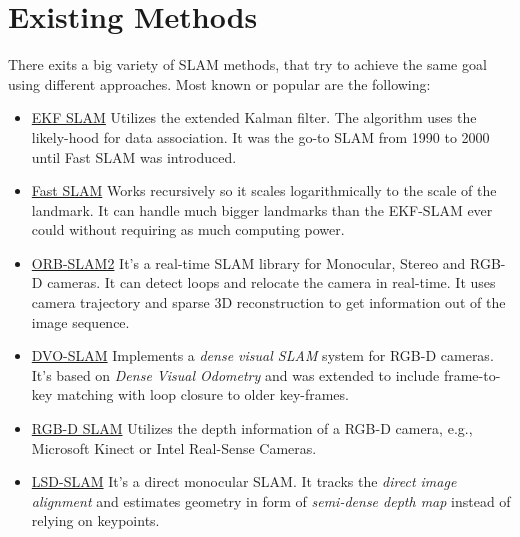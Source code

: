 \section{Existing Methods}
There exits a big variety of SLAM methods, that try to achieve the same goal using different approaches\cite{openslam}.
Most known or popular are the following:
\begin{itemize}
    \item \underline{EKF SLAM} \newline
    Utilizes the extended Kalman filter. The algorithm  uses the likely-hood for data association.
    It was the go-to SLAM from 1990 to 2000 until Fast SLAM was introduced. \cite{Fastslam}
    
    \item \underline{Fast SLAM} \newline
    Works recursively  so it scales logarithmically to the scale of the landmark. It can handle much bigger landmarks than the EKF-SLAM ever could without requiring as much computing power. \cite{Fastslam}
    
    \item \underline{ORB-SLAM2} \newline
    It's a real-time SLAM library for Monocular, Stereo and RGB-D cameras. It can detect loops and relocate the camera in real-time. It uses camera trajectory and sparse 3D reconstruction to get information out of the image sequence.\cite{orbslam}
    
    \item \underline{DVO-SLAM} \newline
    Implements a \textit{dense visual SLAM} system for RGB-D cameras. It's based on \textit{Dense Visual Odometry} and was extended to include frame-to-key matching with loop closure to older key-frames. \cite{dvoslam1}
    
    \item \underline{RGB-D SLAM} \newline
    Utilizes the depth information of a RGB-D camera, e.g., Microsoft Kinect or Intel Real-Sense Cameras.\cite{rosrgbdslam}
    
    \item \underline{LSD-SLAM} \newline
    It's a direct monocular SLAM. It tracks the \textit{direct image alignment} and estimates geometry in form of \textit{semi-dense depth map} instead of relying on keypoints.\cite{lsdslam}
\end{itemize}